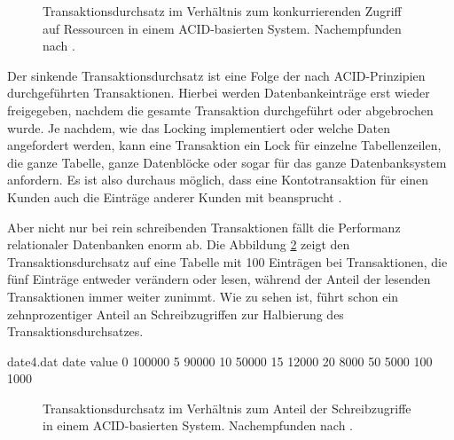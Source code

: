 \documentclass[12pt,oneside,a4paper,parskip]{scrbook}
\begin{document}
\begin{figure}
\begin{center}
\caption[Transaktionsdurchsatz im Verhältnis zum konkurrierenden Zugriff]{Transaktionsdurchsatz im Verhältnis zum konkurrierenden Zugriff auf Ressourcen in einem ACID-basierten System. Nachempfunden nach \cite{salt}.}
\label{salt}
\end{center}
\end{figure}
Der sinkende Transaktionsdurchsatz ist eine Folge der nach ACID-Prinzipien durchgeführten Transaktionen. Hierbei werden Datenbankeinträge erst wieder freigegeben, nachdem die gesamte Transaktion durchgeführt oder abgebrochen wurde. Je nachdem, wie das Locking implementiert oder welche Daten angefordert werden, kann eine Transaktion ein Lock für einzelne Tabellenzeilen, die ganze Tabelle, ganze Datenblöcke oder sogar für das ganze Datenbanksystem anfordern. Es ist also durchaus möglich, dass eine Kontotransaktion für einen Kunden auch die Einträge anderer Kunden mit beansprucht \cite{locking}\cite{dbarchitecture}.

Aber nicht nur bei rein schreibenden Transaktionen fällt die Performanz relationaler Datenbanken enorm ab. Die Abbildung \ref{salt2} zeigt den Transaktionsdurchsatz auf eine Tabelle mit 100 Einträgen bei Transaktionen, die fünf Einträge entweder verändern oder lesen, während der Anteil der lesenden Transaktionen immer weiter zunimmt. Wie zu sehen ist, führt schon ein zehnprozentiger Anteil an Schreibzugriffen zur Halbierung des Transaktionsdurchsatzes.
\begin{filecontents}{date4.dat}
date  value
0     100000
5     90000
10    50000
15    12000
20     8000
50     5000
100    1000
\end{filecontents}


\begin{figure}
\begin{center}
\caption[Transaktionsdurchsatz im Verhältnis zum Anteil der Schreibzugriffe]{Transaktionsdurchsatz im Verhältnis zum Anteil der Schreibzugriffe in einem ACID-basierten System. Nachempfunden nach \cite{salt}.}
\label{salt2}
\end{center}
\end{figure}
\end{document}
